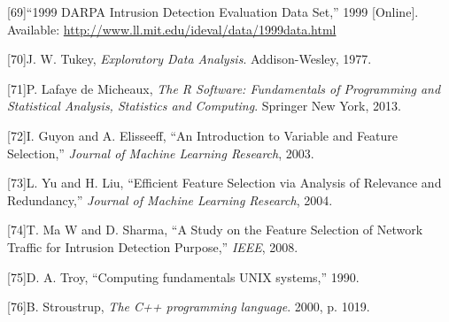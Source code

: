 \documentclass[11pt,a4paper]{article}
\begin{document}
{[}69{]}``1999 DARPA Intrusion Detection Evaluation Data Set,'' 1999
{[}Online{]}. Available:
\url{http://www.ll.mit.edu/ideval/data/1999data.html}

{[}70{]}J. W. Tukey, \emph{Exploratory Data Analysis}. Addison-Wesley,
1977.

{[}71{]}P. Lafaye de Micheaux, \emph{The R Software: Fundamentals of
Programming and Statistical Analysis, Statistics and Computing}.
Springer New York, 2013.

{[}72{]}I. Guyon and A. Elisseeff, ``An Introduction to Variable and
Feature Selection,'' \emph{Journal of Machine Learning Research}, 2003.

{[}73{]}L. Yu and H. Liu, ``Efficient Feature Selection via Analysis of
Relevance and Redundancy,'' \emph{Journal of Machine Learning Research},
2004.

{[}74{]}T. Ma W and D. Sharma, ``A Study on the Feature Selection of
Network Traffic for Intrusion Detection Purpose,'' \emph{IEEE}, 2008.

{[}75{]}D. A. Troy, ``Computing fundamentals UNIX systems,'' 1990.

{[}76{]}B. Stroustrup, \emph{The C++ programming language}. 2000, p.
1019.

\TBcoverpage
\end{document}
